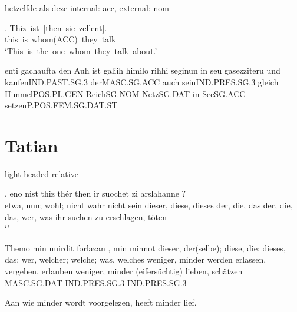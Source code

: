 hetzelfde als deze
internal: acc, external: nom

\exg. Thiz ist [then sie zellent].\\
 this is whom(ACC) they talk\\
 `This is the one whom they talk about.' 



 enti	gachaufta	den	Auh	ist	galiih	himilo	rihhi	seginun	in	seu	gasezziteru
 und	kaufenIND.PAST.SG.3		derMASC.SG.ACC		auch	seinIND.PRES.SG.3	gleich	HimmelPOS.PL.GEN	ReichSG.NOM		NetzSG.DAT		in	SeeSG.ACC		setzenP.POS.FEM.SG.DAT.ST

\phantom{x}

\section{Tatian}

light-headed relative

\exg. eno	nist	thiz	thér	then	ir	suochet	zi	arslahanne	?\\
 etwa, nun; wohl; nicht wahr	nicht	sein	dieser, diese, dieses	der, die, das	der, die, das, wer, was	ihr	suchen	zu	erschlagen, töten\\
 `'




 Themo	min	uuirdit	forlazan	,	min	minnot
 dieser, der(selbe); diese, die; dieses, das; wer, welcher; welche; was, welches	weniger, minder	werden	erlassen, vergeben, erlauben		weniger, minder	(eifersüchtig) lieben, schätzen
 MASC.SG.DAT		IND.PRES.SG.3				IND.PRES.SG.3

 Aan wie minder wordt voorgelezen, heeft minder lief.
